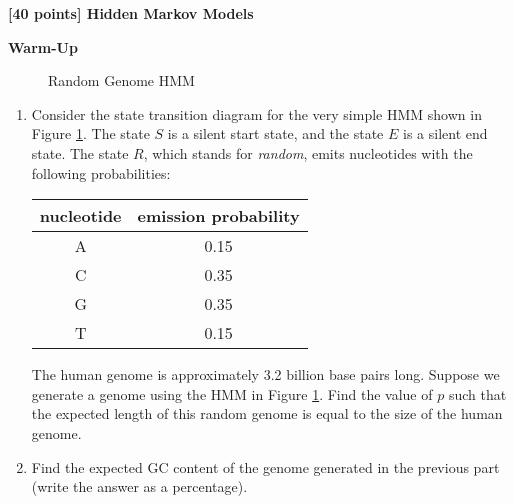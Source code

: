 {\bf [40 points] Hidden Markov Models}\\


\vspace{10pt} 

\textbf{Warm-Up}

\begin{figure}    
\begin{center} 

\label{HMM-prob1a}
\caption{Random Genome HMM}
\end{center}
\end{figure}

\begin{enumerate}

\item Consider the state transition diagram for the very simple HMM shown in Figure \ref{HMM-prob1a}. The state $S$ is a silent start state, and the state $E$ is a silent end state. The state $R$, which stands for \textit{random}, emits nucleotides with the following probabilities: 

\begin{center}
\begin{tabular}{|c|c|}
\hline
nucleotide& emission probability\\
\hline
A& 0.15 \\
C& 0.35 \\
G& 0.35 \\ 
T& 0.15 \\ 
\hline
\end{tabular}
\end{center}

The human genome is approximately 3.2 billion base pairs long. Suppose we generate a genome using the HMM in Figure \ref{HMM-prob1a}. Find the value of $p$ such that the expected length of this random genome is equal to the size of the human genome.

\begin{solution}

\end{solution}

\item Find the expected GC content of the genome generated in the previous part (write the answer as a percentage). 

\begin{solution}


\end{solution}
\end{enumerate}
